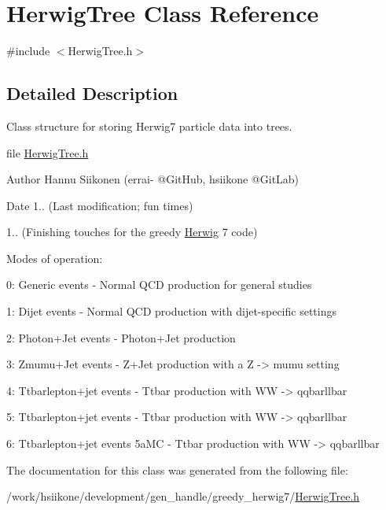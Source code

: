 \hypertarget{class_herwig_tree}{}\section{Herwig\+Tree Class Reference}
\label{class_herwig_tree}


{\ttfamily \#include $<$Herwig\+Tree.\+h$>$}



\subsection{Detailed Description}
Class structure for storing Herwig7 particle data into trees.

file \hyperlink{_herwig_tree_8h}{Herwig\+Tree.\+h}

\begin{DoxyAuthor}{Author}
Hannu Siikonen (errai-\/ @Git\+Hub, hsiikone @Git\+Lab) 
\end{DoxyAuthor}
\begin{DoxyDate}{Date}
1.. (Last modification; fun times) 

1.. (Finishing touches for the greedy \hyperlink{namespace_herwig}{Herwig} 7 code)
\end{DoxyDate}
Modes of operation\+: \begin{DoxyVerb}0: Generic events
    - Normal QCD production for general studies

1: Dijet events
    - Normal QCD production with dijet-specific settings

2: Photon+Jet events
    - Photon+Jet production

3: Zmumu+Jet events
    - Z+Jet production with a Z -> mumu setting

4: Ttbarlepton+jet events
    - Ttbar production with WW -> qqbarllbar

5: Ttbarlepton+jet events \@POWHEG
    - Ttbar production with WW -> qqbarllbar

6: Ttbarlepton+jet events \@MADGRAPH5aMC\@NLO
    - Ttbar production with WW -> qqbarllbar\end{DoxyVerb}
 

The documentation for this class was generated from the following file\+:\begin{DoxyCompactItemize}
\item 
/work/hsiikone/development/gen\+\_\+handle/greedy\+\_\+herwig7/\hyperlink{_herwig_tree_8h}{Herwig\+Tree.\+h}\end{DoxyCompactItemize}
